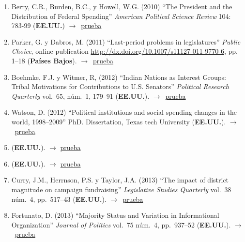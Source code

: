 \documentclass[12 pt, letter]{article}
\newenvironment{CitasMiTrabajo}{
    \begin{footnotesize}
    \begin{enumerate}[label={\footnotesize\emph{cita~\arabic*}},ref=\arabic*] %
        \setlength{\itemsep}{.1\itemsep}
        \setlength{\parskip}{.1\parskip}
    }{\end{enumerate}\end{footnotesize}}
\begin{document}
\begin{CitasMiTrabajo}
       \item Berry, C.R., Burden, B.C., y Howell, W.G. (2010) ``The President and the Distribution of Federal Spending'' \emph{American Political Science Review} 104: 783-99 (\textbf{EE.UU.}) $\rightarrow$~\href{http://ericmagar.com/cv/cites/coxMagar/berryetal2010apsr.pdf}{prueba}

       \item Parker, G. y Dabros, M. (2011) ``Last-period problems in legislatures'' \emph{Public Choice}, online publication \url{http://dx.doi.org/10.1007/s11127-011-9770-6}, pp. 1--18 (\textbf{Pa\'ises Bajos}). $\rightarrow$~\href{http://ericmagar.com/cv/cites/coxMagar/parker+dabros2011pubcho.excerpt.pdf}{prueba}

        \item Boehmke, F.J. y  Witmer, R, (2012) ``Indian Nations as Interest Groups: Tribal Motivations for Contributions to U.S. Senators'' \emph{Political Research Quarterly} vol.~65, n\'um.~1, 179--91  (\textbf{EE.UU.}). $\rightarrow$~\href{http://ericmagar.com/cv/cites/coxMagar/boehmkeSenateContrib2012prq.pdf}{prueba}

        \item Watson, D. (2012) ``Political institutions and social spending changes in the world, 1998--2009'' PhD. Dissertation, Texas tech University (\textbf{EE.UU.}). $\rightarrow$~\href{http://ericmagar.com/cv/cites/coxMagar/watson2012.pdf}{prueba}

        \item {} (\textbf{EE.UU.}). $\rightarrow$ \href{http://ericmagar.com/cv/cites/coxMagar/aleman.calvo.networkInitiation2013ps.pdf}{prueba}

        \item {} (\textbf{EE.UU.}). $\rightarrow$ \href{http://ericmagar.com/cv/cites/coxMagar/bonicaIdeolMarketplace2013ajps.pdf}{prueba}

        \item Curry, J.M., Herrnson, P.S. y Taylor, J.A. (2013)
        ``The impact of district magnitude on campaign fundraising''
        \emph{Legislative Studies Quarterly} vol.\ 38 n\'um.\ 4, pp.\ 517--43 (\textbf{EE.UU.}). $\rightarrow$~\href{http://ericmagar.com/cv/cites/coxMagar/curryEtAl2013lsq.excerpts.pdf}{prueba}

        \item Fortunato, D. (2013)
        ``Majority Status and Variation in Informational Organization''
        \emph{Journal of Politics} vol.\ 75 n\'um.\ 4, pp.\ 937--52 (\textbf{EE.UU.}). $\rightarrow$~\href{http://ericmagar.com/cv/cites/coxMagar/fortunato2013majority.pdf}{prueba}


\end{CitasMiTrabajo}
\end{document}
